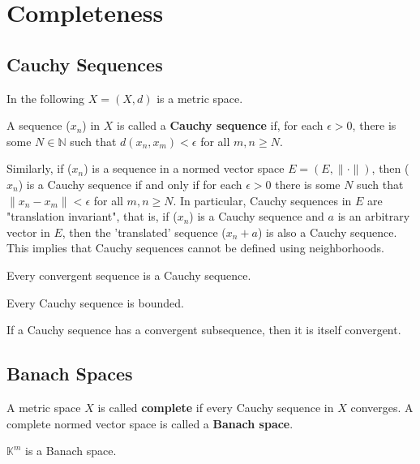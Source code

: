 \chapter{Completeness}

\section{Cauchy Sequences}

In the following \(X = \left(X, d\right)\) is a metric space. 

A sequence (\(x_n\)) in \(X\) is called a \textbf{Cauchy sequence} if, for 
each \(\epsilon > 0\), there is some \(N \in \mathbb{N}\) such that 
\(d\left(x_n, x_m\right) < \epsilon\) for all \(m, n \geq N\). 

Similarly, if (\(x_n\)) is a sequence in a normed vector space \(E = \left(E, \lVert \cdot \rVert\right)\),
then (\(x_n\)) is a Cauchy sequence if and only if for each \(\epsilon > 0\) there is 
some \(N\) such that \(\lVert x_n - x_m \rVert < \epsilon\) for all \(m, n \geq N\). In 
particular, Cauchy sequences in \(E\) are "translation invariant", that is, if (\(x_n\))
is a Cauchy sequence and \(a\) is an arbitrary vector in \(E\), then the 'translated'
sequence (\(x_n + a\)) is also a Cauchy sequence. This implies that Cauchy sequences
cannot be defined using neighborhoods. 

\begin{proposition}
    Every convergent sequence is a Cauchy sequence. 
\end{proposition}

\begin{proposition}
    Every Cauchy sequence is bounded. 
\end{proposition}

\begin{proposition}
    If a Cauchy sequence has a convergent subsequence, then it is itself convergent. 
\end{proposition}

\section{Banach Spaces}

A metric space \(X\) is called \textbf{complete} if every Cauchy sequence in \(X\)
converges. A complete normed vector space is called a \textbf{Banach space}. 

\begin{theorem}
    \(\mathbb{K}^m\) is a Banach space. 
\end{theorem}

